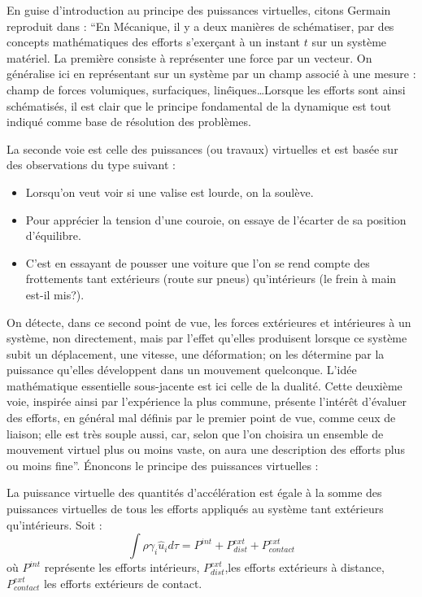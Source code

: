 \documentclass[12pt]{book}
\begin{document}
En guise d'introduction au principe des puissances
virtuelles, citons
Germain reproduit dans \cite{ma:equad:Dautray1} :
``En M\'ecanique, il y a deux mani\`eres de sch\'ematiser, par
des concepts math\'ematiques des efforts s'exer\c cant \`a un instant
$t$ sur un syst\`eme mat\'eriel.
La premi\`ere consiste \`a repr\'esenter une force par un vecteur. On
g\'en\'eralise ici en repr\'esentant sur un syst\`eme par un champ
associ\'e \`a une mesure : champ de forces volumiques, surfaciques,
lin\'e\"\i ques\dots Lorsque les efforts sont ainsi sch\'ematis\'es,
il est clair que le principe fondamental de la dynamique est tout
indiqu\'e comme base de r\'esolution des probl\`emes.

La seconde voie est celle des puissances (ou travaux) virtuelles et est
bas\'ee sur des observations du type suivant :
\begin{itemize}
\item Lorsqu'on veut voir si une valise est lourde, on la soul\`eve.
\item Pour appr\'ecier la tension d'une couroie, on essaye de
l'\'ecarter de sa position d'\'equilibre.
\item C'est en essayant de pousser une voiture que l'on se rend compte
des frottements tant ext\'erieurs (route sur pneus) qu'int\'erieurs
(le frein \`a main est-il mis?).
\end{itemize}
On d\'etecte, dans ce second point de vue, les forces ext\'erieures et
int\'erieures \`a un syst\`eme, non directement, mais par l'effet
qu'elles produisent lorsque ce syst\`eme subit un d\'eplacement, une
vitesse, une d\'eformation; on les d\'etermine par la puissance
qu'elles d\'eveloppent dans un mouvement quelconque. L'id\'ee
math\'ematique essentielle sous-jacente est ici celle de la dualit\'e.
Cette deuxi\`eme voie, inspir\'ee ainsi par l'exp\'erience la plus
commune, pr\'esente l'int\'er\^et d'\'evaluer des efforts, en
g\'en\'eral mal d\'efinis par le premier point de vue, comme ceux de
liaison; elle est tr\`es souple aussi, car, selon que l'on choisira un
ensemble de mouvement virtuel plus ou moins vaste, on aura une
description des efforts plus ou moins fine''.
 \'Enoncons le principe des puissances virtuelles :
\begin{prin}
La puissance virtuelle des quantit\'es d'acc\'el\'eration est \'egale
\`a la somme 
des puissances virtuelles de tous les efforts appliqu\'es au syst\`eme
tant 
ext\'erieurs qu'int\'erieurs. Soit :
\begin{equation}
\int \rho \gamma_i \hat{u}_i
d\tau=P^{int}+P^{ext}_{dist}+P^{ext}_{contact} 
\end{equation}
o\`u $P^{int}$ repr\'esente les efforts int\'erieurs,
$P^{ext}_{dist}$,les efforts ext\'erieurs \`a distance,
$P^{ext}_{contact}$ les efforts ext\'erieurs de contact.
\end{prin}
\end{document}
